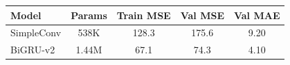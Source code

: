 \begin{tabular}{lcccc}
\toprule
Model & Params & Train MSE & Val MSE & Val MAE \\
\midrule
SimpleConv & 538K & 128.3 & 175.6 & 9.20 \\
BiGRU-v2 & 1.44M & 67.1 & 74.3 & 4.10 \\
\bottomrule
\end{tabular}
